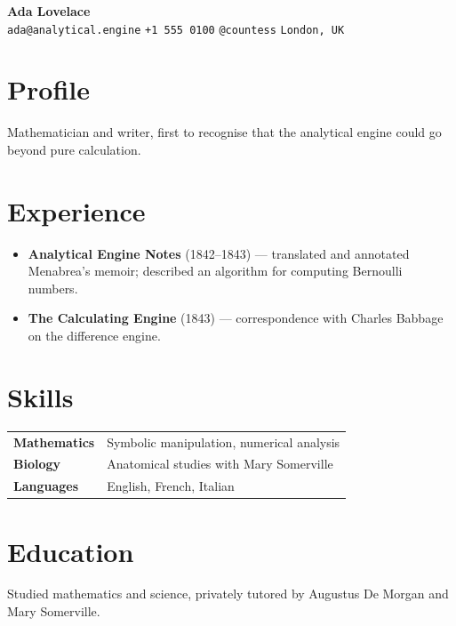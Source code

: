 \documentclass[11pt]{article}
\begin{document}
\begin{center}
  {\fontsize{22}{26}\selectfont\bfseries\sffamily Ada Lovelace} \\
  \vspace{2pt}
  {\small \faEnvelope{} \texttt{ada@analytical.engine} \quad
   \faPhone*{} \texttt{+1 555 0100} \quad
   \faGithub{} \texttt{@countess} \quad
   \faMapMarker*{} \texttt{London, UK}}
\end{center}

\section{Profile}
Mathematician and writer, first to recognise that the analytical
engine could go beyond pure calculation.

\section{Experience}
\begin{itemize}
\item \textbf{Analytical Engine Notes} (1842--1843) --- translated
  and annotated Menabrea's memoir; described an algorithm for
  computing Bernoulli numbers.
\item \textbf{The Calculating Engine} (1843) --- correspondence
  with Charles Babbage on the difference engine.
\end{itemize}

\section{Skills}
\begin{tabularx}{\linewidth}{l >{\raggedright\arraybackslash}X}
\textbf{Mathematics} & Symbolic manipulation, numerical analysis \\
\textbf{Biology}     & Anatomical studies with Mary Somerville \\
\textbf{Languages}   & English, French, Italian \\
\end{tabularx}

\section{Education}
Studied mathematics and science, privately tutored by Augustus
De Morgan and Mary Somerville.
\end{document}

